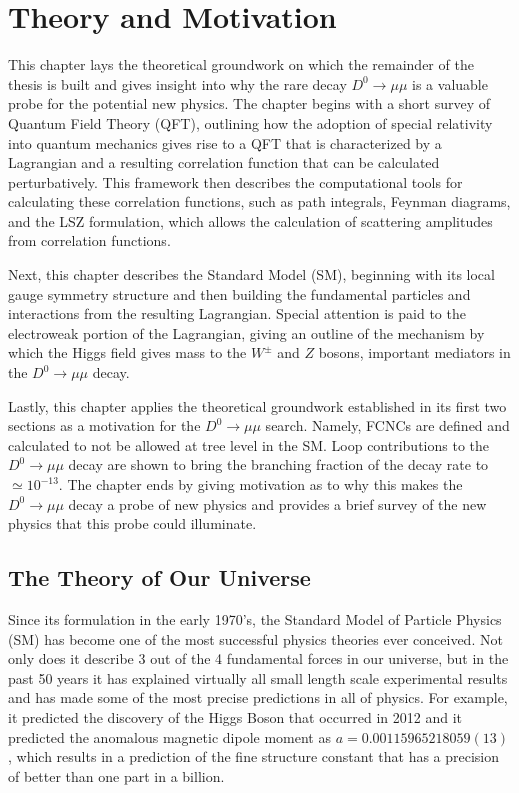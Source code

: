 \chapter{Theory and Motivation}
\label{ch:2}

This chapter lays the theoretical groundwork on which the remainder of the thesis is built and gives insight into why the rare decay $D^0 \to \mu \mu$ is a valuable probe for the potential new physics. The chapter begins with a short survey of Quantum Field Theory (QFT), outlining how the adoption of special relativity into quantum mechanics gives rise to a QFT that is characterized by a Lagrangian and a resulting correlation function that can be calculated perturbatively. This framework then describes the computational tools for calculating these correlation functions, such as path integrals, Feynman diagrams, and the LSZ formulation, which allows the calculation of scattering amplitudes from correlation functions. 

Next, this chapter describes the Standard Model (SM), beginning with its local gauge symmetry structure and then building the fundamental particles and interactions from the resulting Lagrangian. Special attention is paid to the electroweak portion of the Lagrangian, giving an outline of the mechanism by which the Higgs field gives mass to the $W^\pm$ and $Z$ bosons, important mediators in the $D^0 \to \mu \mu$ decay. 

Lastly, this chapter applies the theoretical groundwork established in its first two sections as a motivation for the $D^0 \to \mu \mu$ search. Namely, FCNCs are defined and calculated to not be allowed at tree level in the SM. Loop contributions to the $D^0 \to \mu \mu$ decay are shown to bring the branching fraction of the decay rate to $\simeq 10^{-13}$. The chapter ends by giving motivation as to why this makes the $D^0 \to \mu \mu$ decay a probe of new physics and provides a brief survey of the new physics that this probe could illuminate. 

\section{The Theory of Our Universe}

Since its formulation in the early 1970's, the Standard Model of Particle Physics (SM) has become one of the most successful physics theories ever conceived. Not only does it describe 3 out of the 4 fundamental forces in our universe, but in the past 50 years it has explained virtually all small length scale experimental results and has made some of the most precise predictions in all of physics. For example, it predicted the discovery of the Higgs Boson that occurred in 2012 \cite{ref:cms2012observation}\cite{ref:atlas2012observation} and it predicted the anomalous magnetic dipole moment as $a = 0.00115965218059(13)$ \cite{ref:fan_2023}, which results in a prediction of the fine structure constant that has a precision of better than one part in a billion.

